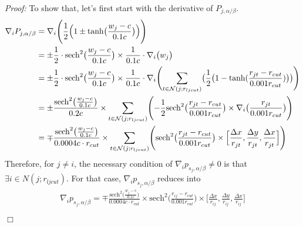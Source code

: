 \documentclass[11pt, oneside]{article}   	%
\begin{document}
\textit{Proof:}  To show that, let's first start with the derivative of $P_{j,\alpha/\beta}$.  
\begin{align}
\nabla_i P_{j,\alpha/\beta} &= \nabla_i \Biggl(\frac{1}{2} \Bigl(1 \pm  \textrm{tanh} \bigl( \frac{w_j-c}{0.1c} \bigr)  \Bigr)\Biggr) \\ \notag
& = \pm \frac{1}{2} \cdot \textrm{sech}^2 \bigl( \frac{w_j-c}{0.1c} \bigr) \times \frac{1}{0.1c}  \cdot \nabla_i \bigl(w_j\bigr) \\ \notag
& = \pm \frac{1}{2} \cdot \textrm{sech}^2 \bigl( \frac{w_j-c}{0.1c} \bigr) \times \frac{1}{0.1c}  \cdot \nabla_i \Biggl(\sum_{t \in \mathcal{N}(j;r_{lj cut})} \bigl(\frac{1}{2} \bigl(1-\textrm{tanh}(\frac{r_{jt}-r_{cut}}{0.001r_{cut}})\bigr)\bigr)\Biggr) \\ \notag
&= \pm \frac{\textrm{sech}^2 \bigl( \frac{w_j-c}{0.1c} \bigr)  }{0.2c} \times  \sum_{t \in \mathcal{N}(j;r_{lj cut})} \Biggl( - \frac{1}{2} \textrm{sech}^2 \bigl(\frac{r_{jt}-r_{cut}}{0.001r_{cut}}\bigr)   \times  \nabla_i \bigl(\frac{r_{jt}}{0.001r_{cut}}\bigr) \Biggr) \\ \notag
&= \mp \frac{\textrm{sech}^2 \bigl( \frac{w_j-c}{0.1c} \bigr)  }{0.0004c\cdot r_{cut}} \times  \sum_{t \in \mathcal{N}(j;r_{lj cut})} \Biggl(\textrm{sech}^2 \bigl(\frac{r_{jt}-r_{cut}}{0.001r_{cut}}\bigr)  \times \Big[\frac{\Delta x}{r_{jt}}, \frac{\Delta y}{r_{jt}}, \frac{\Delta x}{r_{jt}}\Big] \Biggr)
\end{align}
Therefore, for $j \neq i$, the necessary condition of $\nabla_i p_{s_j,\alpha/\beta} \neq 0$ is that $\exists i \in N(j;r_{lj cut})$. For that case, $\nabla_i p_{s_j,\alpha/\beta}$ reduces into 
\begin{align}
\nabla_i p_{s_j,\alpha/\beta} = \mp \frac{\textrm{sech}^2 \bigl( \frac{w_j-c}{0.1c} \bigr)  }{0.0004c\cdot r_{cut}} \times \textrm{sech}^2 \bigl(\frac{r_{ij}-r_{cut}}{0.001r_{cut}}\bigr)  \times \Big[\frac{\Delta x}{r_{ij}}, \frac{\Delta y}{r_{ij}}, \frac{\Delta x}{r_{ij}}\Big] 
\end{align}
\begin{flushright}
$\Box$
\end{flushright}
\end{document}
